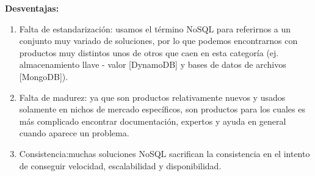 \documentclass[12pt,a4paper]{article}
\begin{document}
\begin{enumerate}
        \textbf{Desventajas:}\\
        \begin{enumerate}
            \item Falta de estandarización: usamos el término NoSQL para referirnos a un conjunto muy variado de soluciones, por lo que podemos encontrarnos con productos muy distintos unos de otros que caen en esta categoría (ej. almacenamiento llave - valor [DynamoDB] y bases de datos de archivos [MongoDB]).
            \item Falta de madurez: ya que son productos relativamente nuevos y usados solamente en nichos de mercado específicos, son productos para los cuales es más complicado encontrar documentación, expertos y ayuda en general cuando aparece un problema.
            \item Consistencia:muchas soluciones NoSQL sacrifican la consistencia en el intento de conseguir velocidad, escalabilidad y disponibilidad.
        \end{enumerate}

\end{enumerate}
\end{document}
